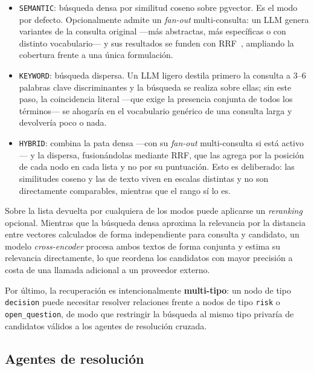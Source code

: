 \begin{itemize}
  \item \texttt{SEMANTIC}: búsqueda densa por similitud coseno sobre pgvector. Es el modo por
        defecto. Opcionalmente admite un \textit{fan-out} multi-consulta: un LLM genera variantes
        de la consulta original —más abstractas, más específicas o con distinto vocabulario— y sus
        resultados se funden con \ac{RRF}~\cite{cormack2009rrf}, ampliando la cobertura frente a una
        única formulación.
  \item \texttt{KEYWORD}: búsqueda dispersa. Un LLM ligero destila primero la consulta a 3--6
        palabras clave discriminantes y la búsqueda se realiza sobre ellas; sin este paso, la
        coincidencia literal —que exige la presencia conjunta de todos los términos— se ahogaría
        en el vocabulario genérico de una consulta larga y devolvería poco o nada.
  \item \texttt{HYBRID}: combina la pata densa —con su \textit{fan-out} multi-consulta si está
        activo— y la dispersa, fusionándolas mediante \ac{RRF}, que las agrega por la posición
        de cada nodo en cada lista y no por su puntuación. Esto es deliberado: las similitudes
        coseno y las de texto viven en escalas distintas y no son directamente comparables,
        mientras que el rango sí lo es.
\end{itemize}

Sobre la lista devuelta por cualquiera de los modos puede aplicarse un \textit{reranking}
opcional. Mientras que la búsqueda densa aproxima la relevancia por la distancia entre vectores
calculados de forma independiente para consulta y candidato, un modelo \textit{cross-encoder}
procesa ambos textos de forma conjunta y estima su relevancia directamente, lo que reordena los
candidatos con mayor precisión a costa de una llamada adicional a un proveedor externo.

Por último, la recuperación es intencionalmente \textbf{multi-tipo}: un nodo de tipo
\texttt{decision} puede necesitar resolver relaciones frente a nodos de tipo \texttt{risk} o
\texttt{open\_question}, de modo que restringir la búsqueda al mismo tipo privaría de candidatos
válidos a los agentes de resolución cruzada.

\subsection{Agentes de resolución}
\label{sec:agentes-resolucion}

